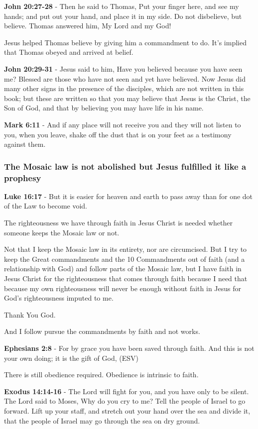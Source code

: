 \documentclass[11pt]{article}
\begin{document}
\textbf{John 20:27-28} - Then he said to Thomas, Put your finger here, and see my hands; and put out your hand, and place it in my side. Do not disbelieve, but believe. Thomas answered him, My Lord and my God!

Jesus helped Thomas believe by giving him a commandment to do. It's implied that Thomas obeyed and arrived at belief.

\textbf{John 20:29-31} - Jesus said to him, Have you believed because you have seen me? Blessed are those who have not seen and yet have believed.  Now Jesus did many other signs in the presence of the disciples, which are not written in this book; but these are written so that you may believe that Jesus is the Christ, the Son of God, and that by believing you may have life in his name.

\textbf{Mark 6:11} - And if any place will not receive you and they will not listen to you, when you leave, shake off the dust that is on your feet as a testimony against them.

\subsubsection{The Mosaic law is not abolished but Jesus fulfilled it like a prophesy}
\label{sec:org6bbcfb7}
\textbf{Luke 16:17} - But it is easier for heaven and earth to pass away than for one dot of the Law to become void.

The righteousness we have through faith in Jesus Christ is needed whether someone keeps the Mosaic law or not.

Not that I keep the Mosaic law in its entirety, nor are circumcised. But I try to keep the Great commandments
and the 10 Commandments out of faith (and a relationship with God) and follow parts of the Mosaic law,
but I have faith in Jesus Christ for the righteousness that comes through faith because I need that because my own
righteousness will never be enough without faith in Jesus for God's righteousness imputed to me.

Thank You God.

And I follow pursue the commandments by faith and not works.

\textbf{Ephesians 2:8} - For by grace you have been saved through faith. And this is not your own doing; it is the gift of God, (ESV)

There is still obedience required. Obedience is intrinsic to faith.

\textbf{Exodus 14:14-16} - The Lord will fight for you, and you have only to be silent.  The Lord said to Moses, Why do you cry to me? Tell the people of Israel to go forward.  Lift up your staff, and stretch out your hand over the sea and divide it, that the people of Israel may go through the sea on dry ground.
\end{document}
